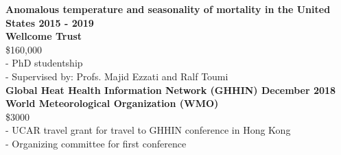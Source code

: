 \noindent \textbf{Anomalous temperature and seasonality of mortality in the United States \hfill 2015 - 2019 \\ 
Wellcome Trust} \\
\$160,000 \\
- PhD studentship\\
- Supervised by: Profs. Majid Ezzati and Ralf Toumi \\

\noindent \textbf{Global Heat Health Information Network (GHHIN) \hfill December 2018\\ 
World Meteorological Organization (WMO)}\\
\$3000 \\
- UCAR travel grant for travel to GHHIN conference in Hong Kong \\
- Organizing committee for first conference \\

\newpage